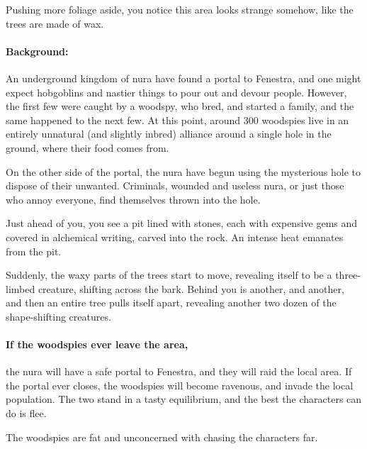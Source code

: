 \begin{multicols}{2}
\begin{boxtext}

  Pushing more foliage aside, you notice this area looks strange somehow, like the trees are made of wax.

\end{boxtext}

\paragraph{Background:}
An underground kingdom of nura have found a portal to Fenestra, and one might expect hobgoblins and nastier things to pour out and devour people.
However, the first few were caught by a woodspy, who bred, and started a family, and the same happened to the next few.
At this point, around 300 woodspies live in an entirely unnatural (and slightly inbred) alliance around a single hole in the ground, where their food comes from.

On the other side of the portal, the nura have begun using the mysterious hole to dispose of their unwanted.
Criminals, wounded and useless nura, or just those who annoy everyone, find themselves thrown into the hole.

\begin{boxtext}

  Just ahead of you, you see a pit lined with stones, each with expensive gems and covered in alchemical writing, carved into the rock.
  An intense heat emanates from the pit.

  Suddenly, the waxy parts of the trees start to move, revealing itself to be a three-limbed creature, shifting across the bark.
  Behind you is another, and another, and then an entire tree pulls itself apart, revealing another two dozen of the shape-shifting creatures.

\end{boxtext}

\paragraph{If the woodspies ever leave the area,}
the nura will have a safe portal to Fenestra, and they will raid the local area.
If the portal ever closes, the woodspies will become ravenous, and invade the local population.
The two stand in a tasty equilibrium, and the best the characters can do is flee.

The woodspies are fat and unconcerned with chasing the characters far.



\end{multicols}
